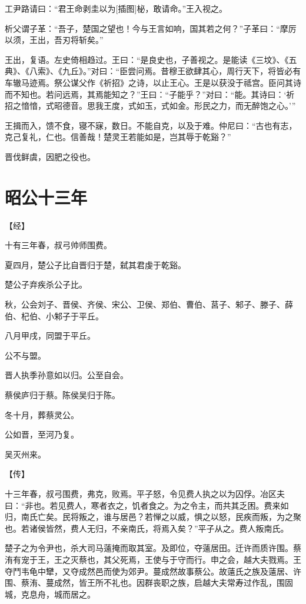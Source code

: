 \documentclass[a4paper,12pt,UTF8,twoside]{ctexbook}
\begin{document}
工尹路请曰：“君王命剥圭以为[插图]柲，敢请命。”王入视之。

析父谓子革：“吾子，楚国之望也！今与王言如响，国其若之何？”子革曰：“摩厉以须，王出，吾刃将斩矣。”

王出，复语。左史倚相趋过。王曰：“是良史也，子善视之。是能读《三坟》、《五典》、《八索》、《九丘》。”对曰：“臣尝问焉。昔穆王欲肆其心，周行天下，将皆必有车辙马迹焉。祭公谋父作《祈招》之诗，以止王心。王是以获没于祗宫。臣问其诗而不知也。若问远焉，其焉能知之？”王曰：“子能乎？”对曰：“能。其诗曰：‘祈招之愔愔，式昭德音。思我王度，式如玉，式如金。形民之力，而无醉饱之心。’”

王揖而入，馈不食，寝不寐，数日。不能自克，以及于难。仲尼曰：“古也有志，克己复礼，仁也。信善哉！楚灵王若能如是，岂其辱于乾谿？”

晋伐鲜虞，因肥之役也。


\chapter{昭公十三年}



【经】

十有三年春，叔弓帅师围费。

夏四月，楚公子比自晋归于楚，弑其君虔于乾谿。

楚公子弃疾杀公子比。

秋，公会刘子、晋侯、齐侯、宋公、卫侯、郑伯、曹伯、莒子、邾子、滕子、薛伯、杞伯、小邾子于平丘。

八月甲戌，同盟于平丘。

公不与盟。

晋人执季孙意如以归。公至自会。

蔡侯庐归于蔡。陈侯吴归于陈。

冬十月，葬蔡灵公。

公如晋，至河乃复。

吴灭州来。

【传】

十三年春，叔弓围费，弗克，败焉。平子怒，令见费人执之以为囚俘。冶区夫曰：“非也。若见费人，寒者衣之，饥者食之。为之令主，而共其乏困。费来如归，南氏亡矣。民将叛之，谁与居邑？若惮之以威，惧之以怒，民疾而叛，为之聚也。若诸侯皆然，费人无归，不亲南氏，将焉入矣？”平子从之。费人叛南氏。

楚子之为令尹也，杀大司马薳掩而取其室。及即位，夺薳居田。迁许而质许围。蔡洧有宠于王，王之灭蔡也，其父死焉，王使与于守而行。申之会，越大夫戮焉。王夺鬥韦龟中犫，又夺成然邑而使为郊尹。蔓成然故事蔡公。故薳氏之族及薳居、许围、蔡洧、蔓成然，皆王所不礼也。因群丧职之族，启越大夫常寿过作乱，围固城，克息舟，城而居之。
\end{document}
